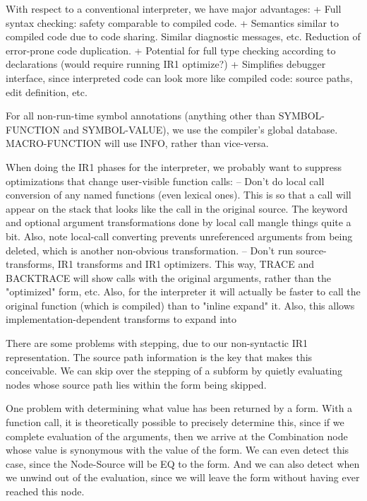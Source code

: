 With respect to a conventional interpreter, we have major advantages:
 + Full syntax checking: safety comparable to compiled code.
 + Semantics similar to compiled code due to code sharing.  Similar diagnostic
   messages, etc.  Reduction of error-prone code duplication.
 + Potential for full type checking according to declarations (would require
   running IR1 optimize?)
 + Simplifies debugger interface, since interpreted code can look more like
   compiled code: source paths, edit definition, etc.

For all non-run-time symbol annotations (anything other than SYMBOL-FUNCTION
and SYMBOL-VALUE), we use the compiler's global database.  MACRO-FUNCTION will
use INFO, rather than vice-versa.

When doing the IR1 phases for the interpreter, we probably want to suppress
optimizations that change user-visible function calls:
 -- Don't do local call conversion of any named functions (even lexical ones).
    This is so that a call will appear on the stack that looks like the call in
    the original source.  The keyword and optional argument transformations
    done by local call mangle things quite a bit.  Also, note local-call
    converting prevents unreferenced arguments from being deleted, which is
    another non-obvious transformation.
 -- Don't run source-transforms, IR1 transforms and IR1 optimizers.  This way,
    TRACE and BACKTRACE will show calls with the original arguments, rather
    than the "optimized" form, etc.  Also, for the interpreter it will
    actually be faster to call the original function (which is compiled) than
    to "inline expand" it.  Also, this allows implementation-dependent
    transforms to expand into %

There are some problems with stepping, due to our non-syntactic IR1
representation.  The source path information is the key that makes this
conceivable.  We can skip over the stepping of a subform by quietly evaluating
nodes whose source path lies within the form being skipped.

One problem with determining what value has been returned by a form.  With a
function call, it is theoretically possible to precisely determine this, since
if we complete evaluation of the arguments, then we arrive at the Combination
node whose value is synonymous with the value of the form.  We can even detect
this case, since the Node-Source will be EQ to the form.  And we can also
detect when we unwind out of the evaluation, since we will leave the form
without having ever reached this node.

